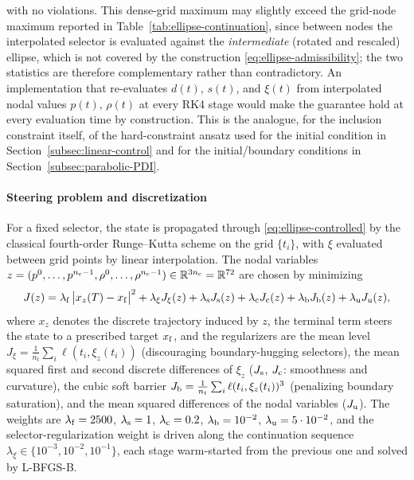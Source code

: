 \documentclass[11pt]{elsarticle}
\theoremstyle{definition}
\theoremstyle{remark}
\numberwithin{equation}{section}
\begin{document}
with no violations. This dense-grid maximum may slightly exceed the
grid-node maximum reported in Table~\ref{tab:ellipse-continuation},
since between nodes the interpolated selector is evaluated against the
\emph{intermediate} (rotated and rescaled) ellipse, which is not covered
by the construction \eqref{eq:ellipse-admissibility}; the two statistics
are therefore complementary rather than contradictory.
An implementation that re-evaluates $d(t)$, $s(t)$, and $\xi(t)$ from
interpolated nodal values $p(t)$, $\rho(t)$ at every RK4 stage would make
the guarantee hold at every evaluation time by construction. This is
the analogue, for the inclusion constraint itself, of the hard-constraint
ansatz used for the initial condition in
Section~\ref{subsec:linear-control} and for the initial/boundary
conditions in Section~\ref{subsec:parabolic-PDI}.

\paragraph{Steering problem and discretization}
For a fixed selector, the state is propagated through
\eqref{eq:ellipse-controlled} by the classical fourth-order
Runge--Kutta scheme on the grid $\{t_i\}$, with $\xi$ evaluated between
grid points by linear interpolation. The nodal variables
$z=(p^0,\dots,p^{n_{\rm c}-1},\rho^0,\dots,\rho^{n_{\rm c}-1})
\in\mathbb{R}^{3n_{\rm c}}=\mathbb{R}^{72}$
are chosen by minimizing
\begin{equation}
	\label{eq:ellipse-cost}
	J(z)=\lambda_{\rm f}\,\bigl|x_z(T)-x_{\rm f}\bigr|^2
	+\lambda_{\xi}J_{\xi}(z)+\lambda_{\rm s}J_{\rm s}(z)
	+\lambda_{\rm c}J_{\rm c}(z)+\lambda_{\rm b}J_{\rm b}(z)
	+\lambda_{\rm u}J_{\rm u}(z),
\end{equation}
where $x_z$ denotes the discrete trajectory induced by $z$, the terminal
term steers the state to a prescribed target $x_{\rm f}$, and the
regularizers are the mean level
$J_{\xi}=\frac{1}{n_t}\sum_i\ell(t_i,\xi_z(t_i))$
(discouraging boundary-hugging selectors), the mean squared first and
second discrete differences of $\xi_z$
($J_{\rm s}$, $J_{\rm c}$: smoothness and curvature), the cubic soft
barrier $J_{\rm b}=\frac{1}{n_t}\sum_i\ell(t_i,\xi_z(t_i))^3$
(penalizing boundary saturation), and the mean squared differences of
the nodal variables ($J_{\rm u}$). The weights are
$\lambda_{\rm f}=2500$, $\lambda_{\rm s}=1$, $\lambda_{\rm c}=0.2$,
$\lambda_{\rm b}=10^{-2}$, $\lambda_{\rm u}=5\cdot10^{-2}$, and the
selector-regularization weight is driven along the continuation sequence
$\lambda_{\xi}\in\{10^{-3},10^{-2},10^{-1}\}$, each stage warm-started
from the previous one and solved by L-BFGS-B.
\end{document}
